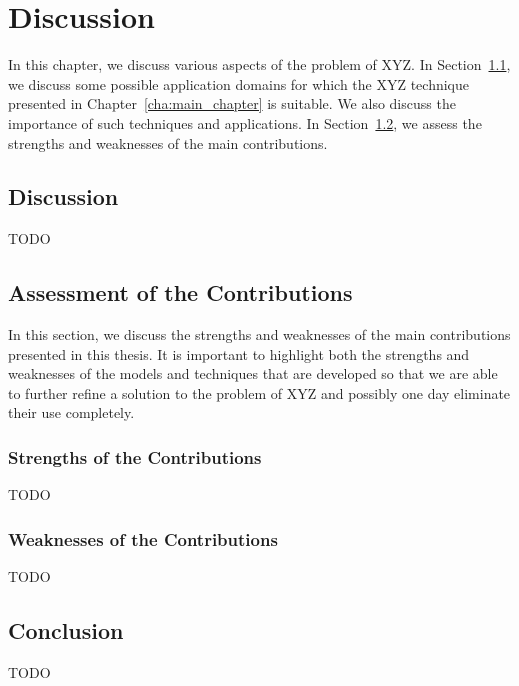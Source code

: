 \chapter{Discussion}
\label{cha:discussion}

In this chapter, we discuss various aspects of the problem of XYZ. In Section~\ref{sec:discussion}, we discuss some possible application domains for which the XYZ technique presented in Chapter~\ref{cha:main_chapter} is suitable. We also discuss the importance of such techniques and applications. In Section~\ref{sec:assessment_of_the_contributions}, we assess the strengths and weaknesses of the main contributions. 

\section{Discussion}
\label{sec:discussion}

TODO

\section{Assessment of the Contributions}
\label{sec:assessment_of_the_contributions}

In this section, we discuss the strengths and weaknesses of the main contributions presented in this thesis. It is important to highlight both the strengths and weaknesses of the models and techniques that are developed so that we are able to further refine a solution to the problem of XYZ and possibly one day eliminate their use completely.

\subsection{Strengths of the Contributions}
\label{sub:strengths_of_the_contributions}

TODO

\subsection{Weaknesses of the Contributions}
\label{sub:weaknesses_of_the_contributions}

TODO

\section{Conclusion}
\label{sec:discussion_conclusion}

TODO

